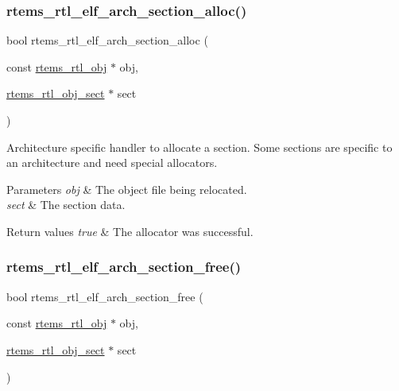 \subsubsection{\texorpdfstring{rtems\_rtl\_elf\_arch\_section\_alloc()}{rtems\_rtl\_elf\_arch\_section\_alloc()}}
{\footnotesize\ttfamily bool rtems\+\_\+rtl\+\_\+elf\+\_\+arch\+\_\+section\+\_\+alloc (\begin{DoxyParamCaption}\item[{const \mbox{\hyperlink{structrtems__rtl__obj}{rtems\+\_\+rtl\+\_\+obj}} $\ast$}]{obj,  }\item[{\mbox{\hyperlink{structrtems__rtl__obj__sect}{rtems\+\_\+rtl\+\_\+obj\+\_\+sect}} $\ast$}]{sect }\end{DoxyParamCaption})}

Architecture specific handler to allocate a section. Some sections are specific to an architecture and need special allocators.


\begin{DoxyParams}{Parameters}
{\em obj} & The object file being relocated. \\
\hline
{\em sect} & The section data. \\
\hline
\end{DoxyParams}

\begin{DoxyRetVals}{Return values}
{\em true} & The allocator was successful. \\
\hline
\end{DoxyRetVals}
\mbox{\label{rtl-elf_8h_a70765f950c9aee6530fbd51d6627d115}} 
\subsubsection{\texorpdfstring{rtems\_rtl\_elf\_arch\_section\_free()}{rtems\_rtl\_elf\_arch\_section\_free()}}
{\footnotesize\ttfamily bool rtems\+\_\+rtl\+\_\+elf\+\_\+arch\+\_\+section\+\_\+free (\begin{DoxyParamCaption}\item[{const \mbox{\hyperlink{structrtems__rtl__obj}{rtems\+\_\+rtl\+\_\+obj}} $\ast$}]{obj,  }\item[{\mbox{\hyperlink{structrtems__rtl__obj__sect}{rtems\+\_\+rtl\+\_\+obj\+\_\+sect}} $\ast$}]{sect }\end{DoxyParamCaption})}

